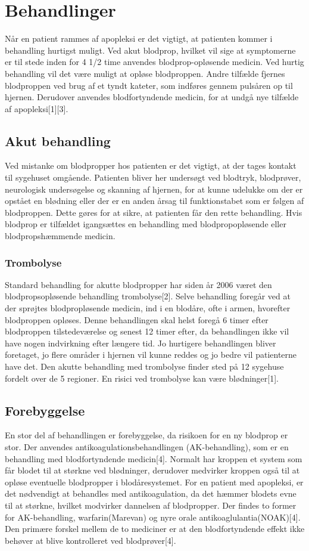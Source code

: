 \section{Behandlinger}
Når en patient rammes af apopleksi er det vigtigt, at patienten kommer i behandling hurtigst muligt. Ved akut blodprop, hvilket vil sige at symptomerne er til stede inden for 4 1/2 time anvendes blodprop-opløsende medicin. Ved hurtig behandling vil det være muligt at opløse blodproppen. Andre tilfælde fjernes blodproppen ved brug af et tyndt kateter, som indføres gennem pulsåren op til hjernen. Derudover anvendes blodfortyndende medicin, for at undgå nye tilfælde af apopleksi[1][3].

\subsection{Akut behandling}
Ved mistanke om blodpropper hos patienten er det vigtigt, at der tages kontakt til sygehuset omgående. Patienten bliver her undersøgt ved blodtryk, blodprøver, neurologisk undersøgelse og skanning af hjernen, for at kunne udelukke om der er opstået en blødning eller der er en anden årsag til funktionstabet som er følgen af blodproppen. Dette gøres for at sikre, at patienten får den rette behandling. Hvis blodprop er tilfældet igangsættes en behandling med blodpropopløsende eller blodpropshæmmende medicin. 

\subsubsection{Trombolyse}
Standard behandling for akutte blodpropper har siden år 2006 været den blodpropsopløsende behandling trombolyse[2]. Selve behandling foregår ved at der sprøjtes blodpropløsende medicin, ind i en blodåre, ofte i armen, hvorefter blodproppen opløses. Denne behandlingen skal helst foregå 6 timer efter blodproppen tilstedeværelse og senest 12 timer efter, da behandlingen ikke vil have nogen indvirkning efter længere tid. Jo hurtigere behandlingen bliver foretaget, jo flere områder i hjernen vil kunne reddes og jo bedre vil patienterne have det. Den akutte behandling med trombolyse finder sted på 12 sygehuse fordelt over de 5 regioner. En risici ved trombolyse kan være blødninger[1]. 

\subsection{Forebyggelse}
En stor del af behandlingen er forebyggelse, da risikoen for en ny blodprop er stor. Der anvendes antikoagulationsbehandlingen (AK-behandling), som er en behandling med blodfortyndende medicin[4]. Normalt har kroppen et system som får blodet til at størkne ved blødninger, derudover medvirker kroppen også til at opløse eventuelle blodpropper i blodåresystemet. For en patient med apopleksi, er det nødvendigt at behandles med antikoagulation, da det hæmmer blodets evne til at størkne, hvilket modvirker dannelsen af blodpropper. Der findes to former for AK-behandling, warfarin(Marevan) og nyre orale antikoaglulantia(NOAK)[4]. Den primære forskel mellem de to mediciner er at den blodfortyndende effekt ikke behøver at blive kontrolleret ved blodprøver[4].

